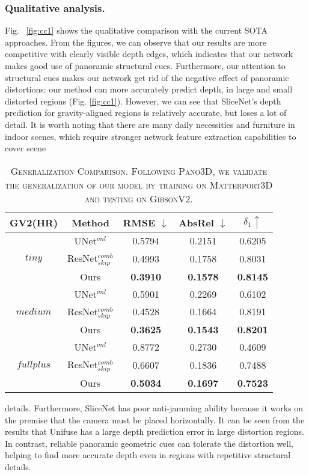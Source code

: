 \documentclass[10pt,times,mathptm,psfig,twocolumn,journals]{IEEEtran}
\begin{document}
 \subsubsection{Qualitative analysis.} Fig. ~\ref{fig:cc1} shows the qualitative comparison with the current SOTA approaches. From the figures, we can observe that our results are more competitive with clearly visible depth edges, which indicates that our network makes good use of panoramic structural cues. Furthermore, our attention to structural cues makes our network get rid of the negative effect of panoramic distortions: our method can more accurately predict depth, in large and small distorted regions (Fig. \ref{fig:cc1}). However, we can see that SliceNet's depth prediction for gravity-aligned regions is relatively accurate, but loses a lot of detail. It is worth noting that there are many daily necessities and furniture in indoor scenes, which require stronger network feature extraction capabilities to cover scene\begin{table}[t]
\begin{center}
\caption{\textsc{Generalization Comparison. Following Pano3D, we validate the generalization of our model by training on Matterport3D and testing on GibsonV2.}}
\label{table:gene}
\setlength\tabcolsep{3pt}
\begin{tabular}{c c c c c}
\hline GV2(HR) & Method & RMSE $\downarrow$ & AbsRel $\downarrow$ & $\delta_{1}\uparrow$\\
\hline
 & UNet$^{vnl}$\cite{albanis2021pano3d}  & 0.5794 & 0.2151& 0.6205\\
$tiny$ & ResNet$_{skip}^{comb}$\cite{albanis2021pano3d}  & 0.4993 & 0.1758 & 0.8031\\
& Ours  & \textbf{0.3910} & \textbf{0.1578} & \textbf{0.8145} \\
\hline
\noalign{\smallskip}
\hline
 & UNet$^{vnl}$\cite{albanis2021pano3d}  & 0.5901 & 0.2269 & 0.6102\\
$medium$& ResNet$_{skip}^{comb}$\cite{albanis2021pano3d}  & 0.4528 & 0.1664 & 0.8191\\
& Ours  & \textbf{0.3625} & \textbf{0.1543} & \textbf{0.8201} \\
\hline
\noalign{\smallskip}
\hline
& UNet$^{vnl}$\cite{albanis2021pano3d}  & 0.8772 & 0.2730 & 0.4609\\
$fullplus$ & ResNet$_{skip}^{comb}$\cite{albanis2021pano3d}  & 0.6607 & 0.1836 &0.7488\\
& Ours  & \textbf{0.5034} & \textbf{0.1697} & \textbf{0.7523} \\
\hline
\end{tabular}\end{center}
\end{table}
details. Furthermore, SliceNet has poor anti-jamming ability because it works on the premise that the camera must be placed horizontally. It can be seen from the results that Unifuse has a large depth prediction error in large distortion regions. In contrast, reliable panoramic geometric cues can tolerate the distortion well, helping to find more accurate depth even in regions with repetitive structural details.
\end{document}
